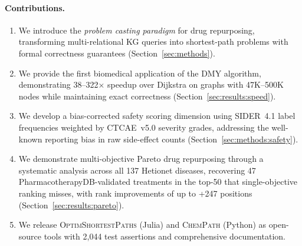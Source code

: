 \documentclass[11pt,a4paper]{article}
\newcommand{\optim}{\textsc{OptimShortestPaths}}
\newcommand{\chempath}{\textsc{ChemPath}}
\begin{document}
\paragraph{Contributions.}
\begin{enumerate}
    \item We introduce the \emph{problem casting paradigm} for drug
    repurposing, transforming multi-relational KG queries into
    shortest-path problems with formal correctness guarantees
    (Section~\ref{sec:methods}).

    \item We provide the first biomedical application of the DMY
    algorithm, demonstrating 38--322$\times$ speedup over Dijkstra
    on graphs with 47K--500K nodes while maintaining exact
    correctness (Section~\ref{sec:results:speed}).

    \item We develop a bias-corrected safety scoring dimension using
    SIDER~4.1 label frequencies weighted by CTCAE~v5.0 severity
    grades, addressing the well-known reporting bias in raw
    side-effect counts (Section~\ref{sec:methods:safety}).

    \item We demonstrate multi-objective Pareto drug repurposing through
    a systematic analysis across all 137 Hetionet diseases, recovering
    47 PharmacotherapyDB-validated treatments in the top-50 that
    single-objective ranking misses, with rank improvements of up to
    +247 positions (Section~\ref{sec:results:pareto}).

    \item We release \optim{} (Julia) and \chempath{} (Python) as
    open-source tools with 2{,}044 test assertions and comprehensive
    documentation.
\end{enumerate}
\end{document}
